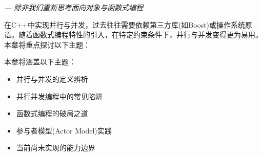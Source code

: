 \begin{flushright}
\textit{--- 除非我们重新思考面向对象与函数式编程}
\end{flushright}

在C++中实现并行与并发，过去往往需要依赖第三方库(如Boost)或操作系统原语。随着函数式编程特性的引入，在特定约束条件下，并行与并发变得更为易用。本章将重点探讨以下主题：

本章将涵盖以下主题：

\begin{itemize}
\item 
并行与并发的定义辨析

\item 
并行并发编程中的常见陷阱

\item 
函数式编程的破局之道

\item 
参与者模型(Actor Model)实践

\item 
当前尚未实现的能力边界
\end{itemize}













